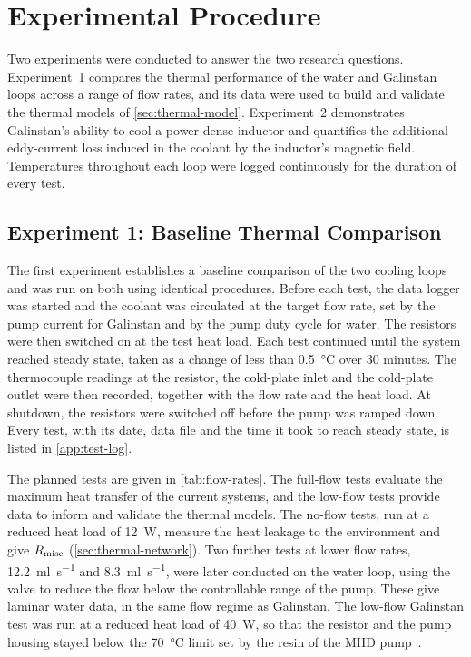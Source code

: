 \section{Experimental Procedure}
\label{sec:programme}

Two experiments were conducted to answer the two research questions.
Experiment~1 compares the thermal performance of the water and Galinstan loops
across a range of flow rates, and its data were used to build and validate the
thermal models of \cref{sec:thermal-model}. Experiment~2 demonstrates
Galinstan's ability to cool a power-dense inductor and quantifies the
additional eddy-current loss induced in the coolant by the inductor's magnetic
field. Temperatures throughout each loop were logged continuously for the
duration of every test.

\subsection{Experiment 1: Baseline Thermal Comparison}
\label{sec:exp1}

The first experiment establishes a baseline comparison of the two cooling loops
and was run on both using identical procedures. Before each test, the data
logger was started and the coolant was circulated at the target flow rate, set
by the pump current for Galinstan and by the pump duty cycle for water. The
resistors were then switched on at the test heat load. Each test continued
until the system reached steady state, taken as a change of less than
\SI{0.5}{\celsius} over 30 minutes. The thermocouple readings at the resistor,
the cold-plate inlet and the cold-plate outlet were then recorded, together with
the flow rate and the heat load. At shutdown, the resistors were switched off
before the pump was ramped down. Every test, with its date, data file and the
time it took to reach steady state, is listed in \cref{app:test-log}.

The planned tests are given in \cref{tab:flow-rates}. The full-flow tests
evaluate the maximum heat transfer of the current systems, and the low-flow
tests provide data to inform and validate the thermal models. The no-flow tests,
run at a reduced heat load of \SI{12}{\watt}, measure the heat leakage to the
environment and give $R_{\mathrm{misc}}$ (\cref{sec:thermal-network}). Two further tests
at lower flow rates,
\SI{12.2}{\milli\litre\per\second} and \SI{8.3}{\milli\litre\per\second}, were later
conducted on the water loop, using the valve to reduce the flow below the
controllable range of the pump. These give laminar water data, in the same flow
regime as Galinstan. The low-flow Galinstan test was run at a reduced heat load
of \SI{40}{\watt}, so that the resistor and the pump housing stayed below the
\SI{70}{\celsius} limit set by the resin of the MHD pump~\cite{kwon_project_2025}.

